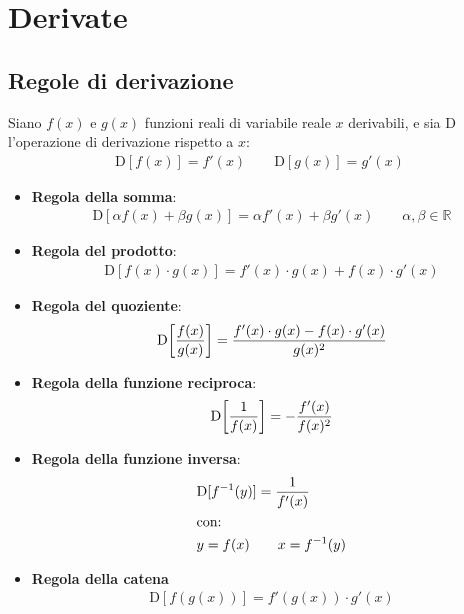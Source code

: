 \chapter{Derivate} %
\label{cha:derivate}

\section{Regole di derivazione} %
\label{sec:regole_di_derivazione}

Siano $f(x)$ e $g(x)$ funzioni reali di variabile reale $x$ derivabili, e sia $\mathrm{D}$ l'operazione di derivazione rispetto a $x$:
\begin{align*}
    \mathrm{D}[f(x)]=f'(x) \qquad \mathrm{D}[g(x)]=g'(x)
\end{align*}
\begin{itemize}
    \item \textbf{Regola della somma}:
    \begin{align*}
        \mathrm{D}[\alpha f(x)+ \beta g(x)] = \alpha f'(x) + \beta g'(x) \qquad \alpha, \beta \in \mathbb{R}
    \end{align*}
    \item \textbf{Regola del prodotto}:
    \begin{align*}
        \mathrm{D} [ {f(x) \cdot g(x)}] = f'(x) \cdot g(x) + f(x) \cdot g'(x) 
    \end{align*}
    \item \textbf{Regola del quoziente}:
    \begin{align*}
        \mathrm{D}\! \left[ {f(x) \over g(x)} \right] = { f'(x)  \cdot g(x) - f(x) \cdot g'(x) \over g(x)^2}
    \end{align*}
    \item \textbf{Regola della funzione reciproca}:
    \begin{align*}
        \mathrm{D}\! \left[ {1 \over f(x)} \right] = -{f'(x) \over f(x)^2} 
    \end{align*}
    \item \textbf{Regola della funzione inversa}:
    \begin{align*}
        &\mathrm{D}[f^{-1}(y)]  =  {1 \over f'(x)} \\
        &\text{con:} \\
        &y = {f(x)} \qquad x = {f^{-1}(y)}
    \end{align*}
    \item \textbf{Regola della catena}
    \begin{align*}
        \mathrm{D} \left[ f \left( g(x) \right) \right] = f' \left( g(x) \right) \cdot g'(x) 
    \end{align*}
\end{itemize}


